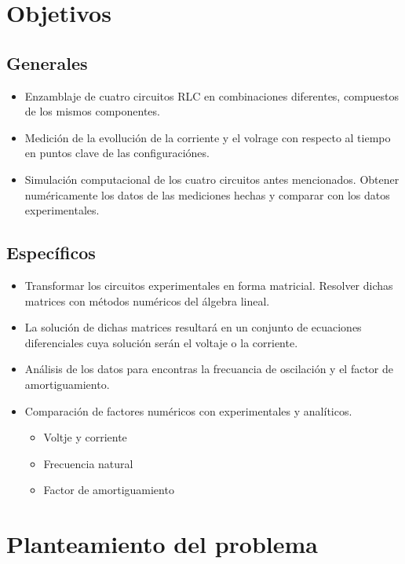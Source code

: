 \documentclass[12pt,twoside]{extarticle}
\begin{document}
\section{Objetivos}
\subsection{Generales}
\begin{itemize}\setlength\itemsep{0.25em}
    \item Enzamblaje de cuatro circuitos RLC en combinaciones diferentes, compuestos de los mismos componentes.
    \item Medición de la evollución de la corriente y el volrage con respecto al tiempo en puntos clave de las configuraciónes.
    \item Simulación computacional de los cuatro circuitos antes mencionados. Obtener numéricamente los datos de las mediciones hechas y comparar con los datos experimentales.
\end{itemize}

\subsection{Específicos}
\begin{itemize}\setlength\itemsep{0.25em}
    \item Transformar los circuitos experimentales en forma matricial. Resolver dichas matrices con métodos numéricos del álgebra lineal.
    \item  La solución de dichas matrices resultará en un conjunto de ecuaciones diferenciales cuya solución serán el voltaje o la corriente.
    \item Análisis de los datos para encontras la frecuancia de oscilación y el factor de amortiguamiento.
    \item  Comparación de factores numéricos con experimentales y analíticos.
        \begin{itemize}\setlength\itemsep{0.25em}
            \item Voltje y corriente
            \item Frecuencia natural
            \item Factor de amortiguamiento
        \end{itemize}

\end{itemize}

\section{Planteamiento del problema}
\end{document}
